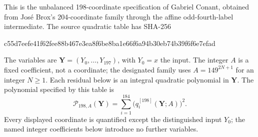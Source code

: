 \begingroup
\allowdisplaybreaks[1]
This is the unbalanced 198-coordinate specification of Gabriel Conant,
obtained from Jos\'e Brox's 204-coordinate family through the affine
odd-fourth-label intermediate.  The source quadratic table has SHA-256
\begin{center}\small\ttfamily
c55d7eefe41f62fee88b467e3ea8f6be8ba1e66f6a94b30eb74b39f6f6e7efad
\end{center}
The variables are $\mathbf Y=(Y_0,\ldots,Y_{197})$, with $Y_0=x$ the input.
The integer $A$ is a fixed coefficient, not a coordinate; the designated
family uses $A=149^{2N+1}$ for an integer $N\geq1$.  Each residual below
is an integral quadratic polynomial in $\mathbf Y$.  The polynomial
specified by this table is
\[
\mathcal P_{198,A}(\mathbf Y)=
\sum_{i=1}^{184}\bigl(q_i^{[198]}(\mathbf Y;A)\bigr)^2.
\]
Every displayed coordinate is quantified except the distinguished input
$Y_0$; the named integer coefficients below introduce no further variables.
